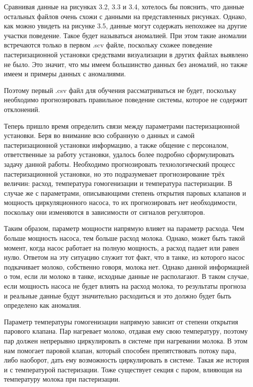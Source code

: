 {  \par \redline Сравнивая данные на рисунках 3.2, 3.3 и 3.4, хотелось бы пояснить, что данные остальных файлов очень схожи с данными на представленных рисунках. Однако, как можно увидеть на рисунке 3.5, данные могут содержать непохожее на другие участки поведение. Такое будет называться аномалией. При этом такие аномалии встречаются только в первом .scv файле, поскольку схожее поведение пастеризационной установки средствами визуализации в других файлах выявлено не было. Это значит, что мы имеем большинство данных без аномалий, но также имеем и примеры данных с аномалиями. 

  \par \redline Поэтому первый .csv файл для обучения рассматриваться не будет, поскольку необходимо прогнозировать правильное поведение системы, которое не содержит отклонений. 

  \par \redline Теперь пришло время определить связи между параметрами пастеризационной установки. Беря во внимание всю собранную о данных и самой пастеризационной установки информацию, а также общение с персоналом, ответственные за работу установки, удалось более подробно сформулировать задачу данной работы. Необходимо прогнозировать технологический процесс пастеризационной установки, но это подразумевает прогнозирование трёх величин: расход, температура гомогенизации и температура пастеризации. В случае же с параметрами, описывающими степень открытия паровых клапанов и мощность циркуляционного насоса, то их прогнозировать нет необходимости, поскольку они изменяются в зависимости от сигналов регуляторов. 

  \par \redline Таким образом, параметр мощности напрямую влияет на параметр расхода. Чем больше мощность насоса, тем больше расход молока. Однако, может быть такой момент, когда насос работает на полную мощность, а расход падает или равен нулю. Ответом на эту ситуацию служит тот факт, что в танке, из которого насос подкачивает молоко, собственно говоря, молока нет. Однако данной информацией о том, если ли молоко в танке, исходные данные не располагают. В таком случае, если мощность насоса не будет влиять на расход молока, то результаты прогноза и реальные данные будут значительно расходиться и это должно будет быть определено как аномалия. 

  \par \redline Параметр температуры гомогенизации напрямую зависит от степени открытия парового клапана. Пар нагревает молоко, отдавая ему свою температуру, поэтому пар должен непрерывно циркулировать в системе при нагревании молока. В этом нам помогает паровой клапан, который способен препятствовать потоку пара, либо наоборот, дать ему возможность циркулировать в системе. Такая же история и с температурой пастеризации. Тоже существует секция с паром, влияющая на температуру молока при пастеризации. 

}
